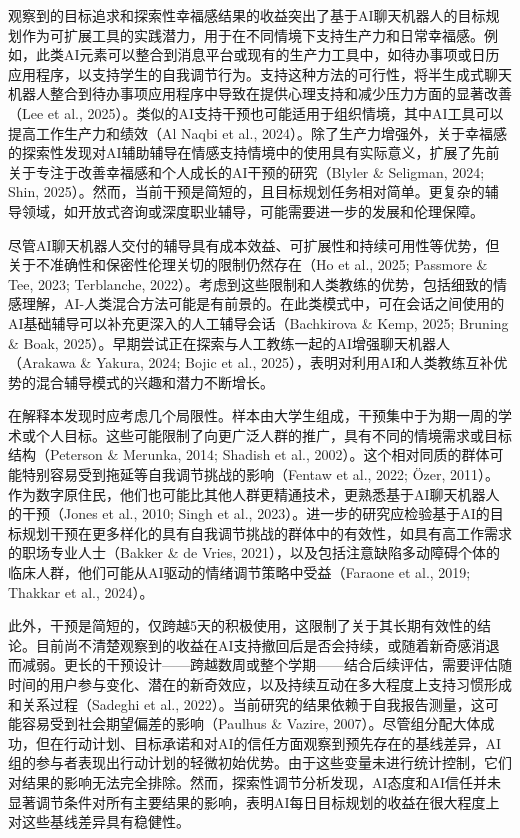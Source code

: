 \par 观察到的目标追求和探索性幸福感结果的收益突出了基于AI聊天机器人的目标规划作为可扩展工具的实践潜力，用于在不同情境下支持生产力和日常幸福感。例如，此类AI元素可以整合到消息平台或现有的生产力工具中，如待办事项或日历应用程序，以支持学生的自我调节行为。支持这种方法的可行性，将半生成式聊天机器人整合到待办事项应用程序中导致在提供心理支持和减少压力方面的显著改善（Lee et al., 2025）。类似的AI支持干预也可能适用于组织情境，其中AI工具可以提高工作生产力和绩效（Al Naqbi et al., 2024）。除了生产力增强外，关于幸福感的探索性发现对AI辅助辅导在情感支持情境中的使用具有实际意义，扩展了先前关于专注于改善幸福感和个人成长的AI干预的研究（Blyler \& Seligman, 2024; Shin, 2025）。然而，当前干预是简短的，且目标规划任务相对简单。更复杂的辅导领域，如开放式咨询或深度职业辅导，可能需要进一步的发展和伦理保障。

\par 尽管AI聊天机器人交付的辅导具有成本效益、可扩展性和持续可用性等优势，但关于不准确性和保密性伦理关切的限制仍然存在（Ho et al., 2025; Passmore \& Tee, 2023; Terblanche, 2022）。考虑到这些限制和人类教练的优势，包括细致的情感理解，AI-人类混合方法可能是有前景的。在此类模式中，可在会话之间使用的AI基础辅导可以补充更深入的人工辅导会话（Bachkirova \& Kemp, 2025; Bruning \& Boak, 2025）。早期尝试正在探索与人工教练一起的AI增强聊天机器人（Arakawa \& Yakura, 2024; Bojic et al., 2025），表明对利用AI和人类教练互补优势的混合辅导模式的兴趣和潜力不断增长。

\par 在解释本发现时应考虑几个局限性。样本由大学生组成，干预集中于为期一周的学术或个人目标。这些可能限制了向更广泛人群的推广，具有不同的情境需求或目标结构（Peterson \& Merunka, 2014; Shadish et al., 2002）。这个相对同质的群体可能特别容易受到拖延等自我调节挑战的影响（Fentaw et al., 2022; Özer, 2011）。作为数字原住民，他们也可能比其他人群更精通技术，更熟悉基于AI聊天机器人的干预（Jones et al., 2010; Singh et al., 2023）。进一步的研究应检验基于AI的目标规划干预在更多样化的具有自我调节挑战的群体中的有效性，如具有高工作需求的职场专业人士（Bakker \& de Vries, 2021），以及包括注意缺陷多动障碍个体的临床人群，他们可能从AI驱动的情绪调节策略中受益（Faraone et al., 2019; Thakkar et al., 2024）。

\par 此外，干预是简短的，仅跨越5天的积极使用，这限制了关于其长期有效性的结论。目前尚不清楚观察到的收益在AI支持撤回后是否会持续，或随着新奇感消退而减弱。更长的干预设计——跨越数周或整个学期——结合后续评估，需要评估随时间的用户参与变化、潜在的新奇效应，以及持续互动在多大程度上支持习惯形成和关系过程（Sadeghi et al., 2022）。当前研究的结果依赖于自我报告测量，这可能容易受到社会期望偏差的影响（Paulhus \& Vazire, 2007）。尽管组分配大体成功，但在行动计划、目标承诺和对AI的信任方面观察到预先存在的基线差异，AI组的参与者表现出行动计划的轻微初始优势。由于这些变量未进行统计控制，它们对结果的影响无法完全排除。然而，探索性调节分析发现，AI态度和AI信任并未显著调节条件对所有主要结果的影响，表明AI每日目标规划的收益在很大程度上对这些基线差异具有稳健性。

